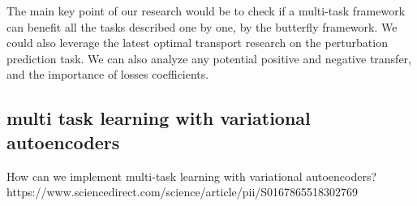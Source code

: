 \documentclass[12pt, a4paper]{article}
\begin{document}
The main key point of our research would be to check if a multi-task framework can benefit all the tasks described one by one, by the butterfly framework. We could also leverage the latest optimal transport research on the perturbation prediction task. We can also analyze any potential positive and negative transfer, and the importance of losses coefficients.

\subsection{multi task learning with variational autoencoders}

How can we implement multi-task learning with variational autoencoders?
https://www.sciencedirect.com/science/article/pii/S0167865518302769

\clearpage



\end{document}
